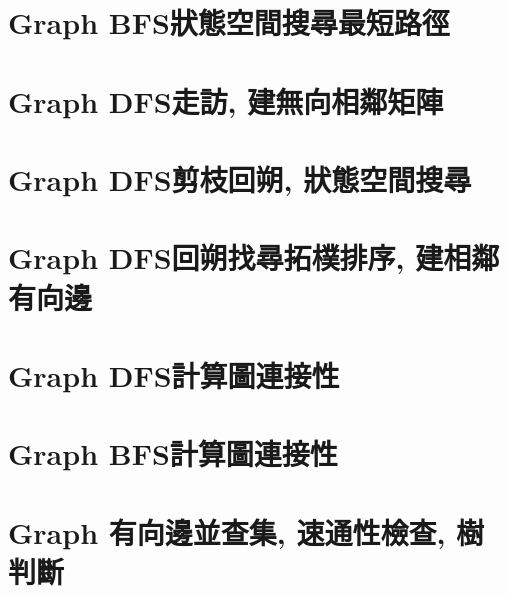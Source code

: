 \documentclass{article}
\begin{document}
\begin{multicols}{2}
\section{Graph BFS狀態空間搜尋最短路徑}



\section{Graph DFS走訪, 建無向相鄰矩陣}



\section{Graph DFS剪枝回朔, 狀態空間搜尋}



\section{Graph DFS回朔找尋拓樸排序, 建相鄰有向邊}



\section{Graph DFS計算圖連接性}



\section{Graph BFS計算圖連接性}



\section{Graph 有向邊並查集, 速通性檢查, 樹判斷}




\end{multicols}
\end{document}
